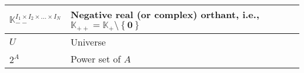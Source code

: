 \begin{xltabular}{\textwidth}{XX}
	\(\mathbb{K}_{--}^{I_1\times I_2 \times \dots \times I_N}\)                                                                                             & Negative real (or complex) orthant, i.e., \(\mathbb{K}_{++} = \mathbb{K}_{+}\setminus\left\{ \mathbf{0} \right\}\) \cite{boydConvexOptimization2004}                                                                                                \\ \hline
	\(U\)                                                                                                                                                   & Universe                                                                                                                                                                                                                                            \\ \hline
	\(2^A\)                                                                                                                                                 & Power set of \(A\)                                                                                                                                                                                                                                  \\ \hline
\end{xltabular}

